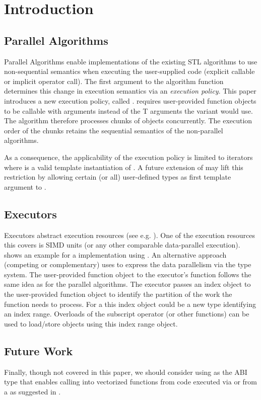 \section{Introduction}

\subsection{Parallel Algorithms}
Parallel Algorithms enable implementations of the existing STL algorithms to use non-sequential semantics when executing the user-supplied code (explicit callable or implicit operator call).
The first argument to the algorithm function determines this change in execution semantics via an \emph{execution policy}.
This paper introduces a new execution policy, called \dataparEP.
\dataparEP requires user-provided function objects to be callable with \datapar[<T, Abi>] arguments instead of the \type T arguments the \seqEP variant would use.
The algorithm therefore processes chunks of  objects concurrently.
The execution order of the chunks retains the sequential semantics of the non-parallel algorithms.

As a consequence, the applicability of the execution policy is limited to iterators where  is a valid template instantiation of \datapar.
A future extension of \datapar may lift this restriction by allowing certain (or all) user-defined types as first template argument to \datapar.

\subsection{Executors}
Executors abstract execution resources (see e.g. \citep{P0058R1}).
One of the execution resources this covers is SIMD units (or any other comparable data-parallel execution).
\citep{P0058R1} shows an example for a  implementation using .
An alternative approach (competing or complementary) uses \datapar to express the data parallelism via the type system.
The user-provided function object to the executor's  function follows the same idea as for the parallel algorithms.
The executor passes an index object to the user-provided function object to identify the partition of the work the function needs to process.
For a  this index object could be a new type identifying an index range.
Overloads of the subscript operator (or other functions) can be used to load/store \datapar objects using this index range object.

\subsection{Future Work}
Finally, though not covered in this paper, we should consider using \datapar as the ABI type that enables calling into vectorized functions from code executed via  or from a  as suggested in \citep{P0058R1}.

